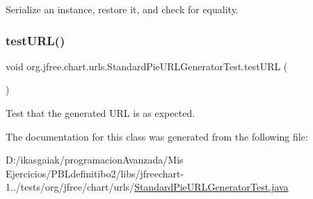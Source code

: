 Serialize an instance, restore it, and check for equality. \mbox{\label{classorg_1_1jfree_1_1chart_1_1urls_1_1_standard_pie_u_r_l_generator_test_a22c037cb0600e3c573560b7d9c208ba6}} 
\subsubsection{\texorpdfstring{test\+U\+R\+L()}{testURL()}}
{\footnotesize\ttfamily void org.\+jfree.\+chart.\+urls.\+Standard\+Pie\+U\+R\+L\+Generator\+Test.\+test\+U\+RL (\begin{DoxyParamCaption}{ }\end{DoxyParamCaption})}

Test that the generated U\+RL is as expected. 

The documentation for this class was generated from the following file\+:\begin{DoxyCompactItemize}
\item 
D\+:/ikasgaiak/programacion\+Avanzada/\+Mis Ejercicios/\+P\+B\+Ldefinitibo2/libs/jfreechart-\/1../tests/org/jfree/chart/urls/\mbox{\hyperlink{_standard_pie_u_r_l_generator_test_8java}{Standard\+Pie\+U\+R\+L\+Generator\+Test.\+java}}\end{DoxyCompactItemize}
